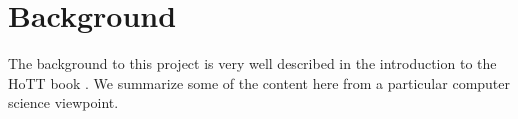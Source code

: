 \documentclass[twocolumn,a4paper,11pt]{article}
\begin{document}



\section{Background}

The background to this project is very well described in the
introduction to the HoTT book \cite{hott-book}. We summarize some of
the content here from a particular computer science viewpoint.
\end{document}

